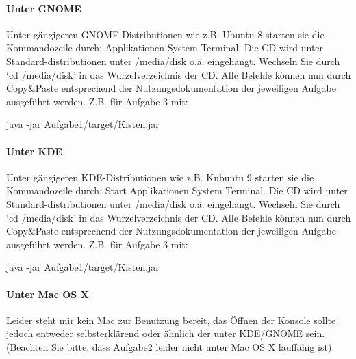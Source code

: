 \documentclass[a4paper,11pt]{scrartcl}
\theoremstyle{definition}
\theoremstyle{remark}
\begin{document}
\paragraph{Unter GNOME}
Unter gängigeren GNOME Distributionen wie z.B. Ubuntu 8 starten sie die Kommandozeile durch:
Applikationen \then System \then Terminal.
Die CD wird unter Standard-distributionen unter /media/disk o.ä. eingehängt. Wechseln Sie durch `cd /media/disk' in das Wurzelverzeichnis der CD.
Alle Befehle können nun durch Copy\&Paste entsprechend der Nutzungsdokumentation der jeweiligen Aufgabe ausgeführt werden. Z.B. für Aufgabe 3 mit:
\begin{center} java -jar Aufgabe1/target/Kisten.jar \end{center}
\paragraph{Unter KDE}
Unter gängigeren KDE-Distributionen wie z.B. Kubuntu 9 starten sie die Kommandozeile durch:
Start \then Applikationen \then System \then Terminal.
Die CD wird unter Standard-distributionen unter /media/disk o.ä. eingehängt. Wechseln Sie durch `cd /media/disk' in das Wurzelverzeichnis der CD.
Alle Befehle können nun durch Copy\&Paste entsprechend der Nutzungsdokumentation der jeweiligen Aufgabe ausgeführt werden. Z.B. für Aufgabe 3 mit:
\begin{center} java -jar Aufgabe1/target/Kisten.jar \end{center}
\paragraph{Unter Mac OS X}
Leider steht mir kein Mac zur Benutzung bereit, das Öffnen der Konsole sollte jedoch entweder selbsterklärend oder
ähnlich der unter KDE/GNOME sein. (Beachten Sie bitte, dass Aufgabe2 leider nicht unter Mac OS X lauffähig ist)

%


\end{document}
